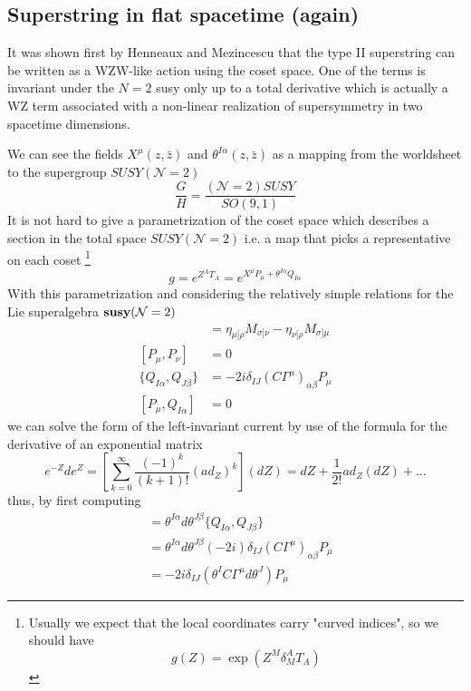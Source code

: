 \documentclass[a4paper,12pt]{article}
\numberwithin{equation}{section}
\numberwithin{thm}{section}
\numberwithin{exm}{section}
\newcommand{\zb}{{\bar z}}
\newcommand{\<}{{\langle}}
\renewcommand{\>}{{\rangle}}
\newcommand{\mc}{\mathcal}
\renewcommand{\a}{{\alpha}}
\renewcommand{\b}{{\beta}}
\renewcommand{\d}{{\delta}}
\newcommand{\G}{{\Gamma}}
\newcommand{\m}{{\mu}}
\newcommand{\n}{{\nu}}
\renewcommand{\r}{{\rho}}
\newcommand{\s}{{\sigma}}
\renewcommand{\t}{{\theta}}
\begin{document}
\subsection{Superstring in flat spacetime (again)}
It was shown first by Henneaux and Mezincescu \cite{Henneaux1985} that the type II superstring can be written as a WZW-like action using the coset space. One of the terms is invariant under the $N=2$ susy only up to a total derivative which is actually a WZ term associated with a non-linear realization of supersymmetry in two spacetime dimensions.

We can see the fields $X^\m(z,\zb)$ and $\t^{I\a}(z,\zb)$ as a mapping from the worldsheet to the supergroup $SUSY(\mc N = 2)$
	\begin{equation}
	\frac{G}{H} = \frac{(\mc N=2)SUSY}{SO(9,1)}
	\end{equation}
It is not hard to give a parametrization of the coset space which describes a section in the total space $SUSY(\mc N=2)$ i.e. a map that picks a representative on each coset%
\footnote{Usually we expect that the local coordinates carry "curved indices", so we should have $$ g(Z) = \exp( Z^M\d_M^A T_A) $$}
	\begin{equation}
	g = e^{Z^A T_A} = e^{X^\m P_\m + \t^{I\a}Q_{I\a}}
	\end{equation}
With this parametrization and considering the relatively simple relations for the Lie superalgebra ${\rm\bf susy}(\mc N=2)$
	\begin{align}
	[M_{\m\n}, M_{\r\s}] & = \eta_{\m[\r}M_{\s]\n} - \eta_{\n[\r} M_{\s]\m} \\
	[P_\m, P_\n] & = 0 \\
	\{Q_{I\a}, Q_{J\b}\} & = - 2 i \d_{IJ}(C \G^\m)_{\a\b} P_\m \\
	[P_\m, Q_{I\a}] & = 0
	\end{align}
we can solve the form of the left-invariant current by use of the formula for the derivative of an exponential matrix
	\begin{equation}
	e^{-Z}d e^Z = \left[ \sum_{k = 0}^\infty \frac{(-1)^k}{(k+1)!} (ad_Z)^k \right](dZ) = dZ + \frac{1}{2!} ad_Z(dZ) + \ldots
	\end{equation}
thus, by first computing
	\begin{align}
	[X^\m P_\m + \t^{I\a} Q_{I\a}, dX^\n P_\n + d\t^{J\b} Q_{J\b}] & = \t^{I\a} d\t^{J\b} \{Q_{I\a}, Q_{J\b}\} \nonumber \\
	& = \t^{I\a} d\t^{J\b} (-2i)\d_{IJ}(C \G^\m)_{\a\b} P_\m \nonumber \\
	& = -2i\d_{IJ} (\t^I C\G^\m d\t^J) P_\m
	\end{align}
\end{document}
